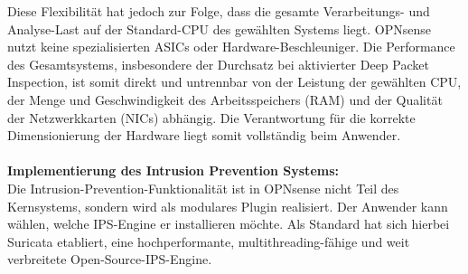 Diese Flexibilität hat jedoch zur Folge, dass die gesamte Verarbeitungs- und Analyse-Last auf der Standard-CPU des gewählten Systems liegt. OPNsense nutzt keine spezialisierten ASICs oder Hardware-Beschleuniger. Die Performance des Gesamtsystems, insbesondere der Durchsatz bei aktivierter Deep Packet Inspection, ist somit direkt und untrennbar von der Leistung der gewählten CPU, der Menge und Geschwindigkeit des Arbeitsspeichers (RAM) und der Qualität der Netzwerkkarten (NICs) abhängig. Die Verantwortung für die korrekte Dimensionierung der Hardware liegt somit vollständig beim Anwender.\\\\

\textbf{Implementierung des Intrusion Prevention Systems:}\\
Die Intrusion-Prevention-Funktionalität ist in OPNsense nicht Teil des Kernsystems, sondern wird als modulares Plugin realisiert. Der Anwender kann wählen, welche IPS-Engine er installieren möchte. Als Standard hat sich hierbei Suricata etabliert, eine hochperformante, multithreading-fähige und weit verbreitete Open-Source-IPS-Engine.\\

